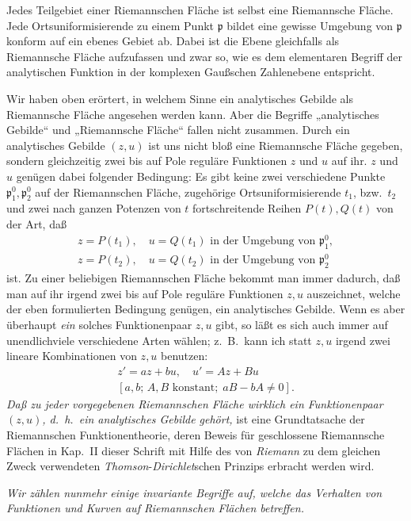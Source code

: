 \documentclass{article}
\begin{document}
Jedes Teilgebiet einer Riemannschen Fläche ist selbst eine Riemannsche Fläche. Jede Ortsuniformisierende zu einem Punkt $\mathfrak{p}$ bildet eine gewisse Umgebung von $\mathfrak{p}$ konform auf ein ebenes Gebiet ab. Dabei ist die Ebene gleichfalls als Riemannsche Fläche aufzufassen und zwar so, wie es dem elementaren Begriff der analytischen Funktion in der komplexen Gaußschen Zahlenebene entspricht.

Wir haben oben erörtert, in welchem Sinne ein analytisches Gebilde als Riemannsche Fläche angesehen werden kann. Aber die Begriffe „analytisches Gebilde“ und „Riemannsche Fläche“ fallen nicht zusammen. Durch ein analytisches Gebilde $(z, u)$ ist uns nicht bloß eine Riemannsche Fläche gegeben, sondern gleichzeitig zwei bis auf Pole reguläre Funktionen $z$ und $u$ auf ihr. $z$ und $u$ genügen dabei folgender Bedingung: Es gibt keine zwei verschiedene Punkte $\mathfrak{p}_1^0, \mathfrak{p}_2^0$ auf der Riemannschen Fläche, zugehörige Ortsuniformisierende $t_1$, bzw.\ $t_2$ und zwei nach ganzen Potenzen von $t$ fortschreitende Reihen $P(t), Q(t)$ von der Art, daß
\[ \begin{gathered}
z = P(t_1), \quad u = Q(t_1) \text{ in der Umgebung von } \mathfrak{p}_1^0, \\
z = P(t_2), \quad u = Q(t_2) \text{ in der Umgebung von } \mathfrak{p}_2^0
\end{gathered} \]
ist. Zu einer beliebigen Riemannschen Fläche bekommt man immer dadurch, daß man auf ihr irgend zwei bis auf Pole reguläre Funktionen $z, u$ auszeichnet, welche der eben formulierten Bedingung genügen, ein analytisches Gebilde. Wenn es aber überhaupt \emph{ein} solches Funktionenpaar $z, u$ gibt, so läßt es sich auch immer auf unendlichviele verschiedene Arten wählen; z.\ B.\ kann ich statt $z, u$ irgend zwei lineare Kombinationen von $z, u$ benutzen:
\[ \begin{gathered}
z' = a z + b u, \quad u' = A z + B u \\
[a, b;\, A, B \text{ konstant};\; a B - b A \neq 0].
\end{gathered} \]
\emph{Daß zu jeder vorgegebenen Riemannschen Fläche wirklich ein Funktionenpaar $(z, u)$, d.\ h.\ ein analytisches Gebilde gehört,} ist eine Grundtatsache der Riemannschen Funktionentheorie, deren Beweis für geschlossene Riemannsche Flächen in Kap.\ II dieser Schrift mit Hilfe des von \emph{Riemann} zu dem gleichen Zweck verwendeten \emph{Thomson}-\emph{Dirichlet}schen Prinzips erbracht werden wird.

\emph{Wir zählen nunmehr einige invariante Begriffe auf, welche das Verhalten von Funktionen und Kurven auf Riemannschen Flächen betreffen.}
\end{document}
